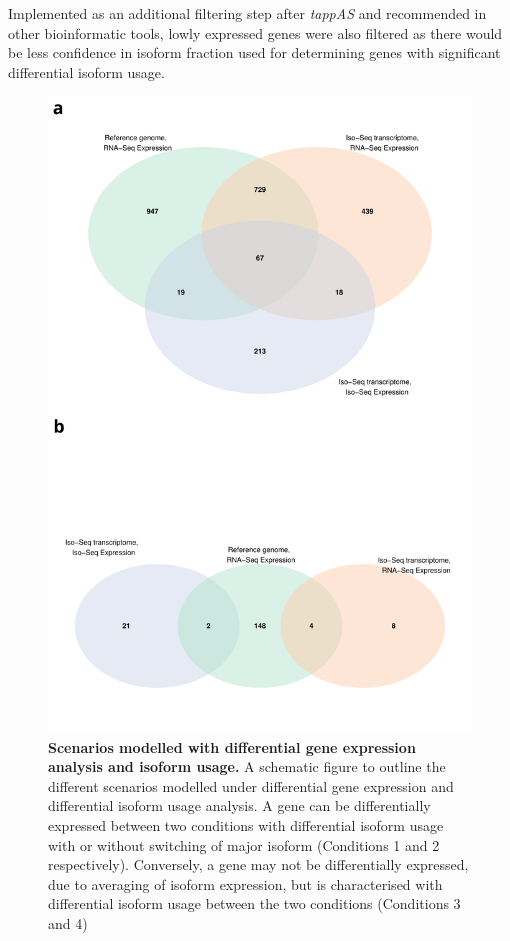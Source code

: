 Implemented as an additional filtering step after \textit{tappAS} and recommended in other bioinformatic tools\cite{Vitting-Seerup2017}, lowly expressed genes were also filtered as there would be less confidence in isoform fraction used for determining genes with significant differential isoform usage.  

\begin{figure}[htp]
	\begin{center}
		\includegraphics[page=3,trim={1cm 17cm 0cm 0cm},clip,scale = 0.45]{Figures/WholeDifferentialAnalysis.pdf}
	\end{center}
	\captionsetup{width=0.95\textwidth}
	\caption[Scenarios modelled with differential gene expression analysis and isoform usage]%
	{\textbf{Scenarios modelled with differential gene expression analysis and isoform usage.} A schematic figure to outline the different scenarios modelled under differential gene expression and differential isoform usage analysis. A gene can be differentially expressed between two conditions with differential isoform usage with or without switching of major isoform (Conditions 1 and 2 respectively). Conversely, a gene may not be differentially expressed, due to averaging of isoform expression, but is characterised with differential isoform usage between the two conditions (Conditions 3 and 4)}   
	\label{fig:DIU_DEA_model}
\end{figure}

